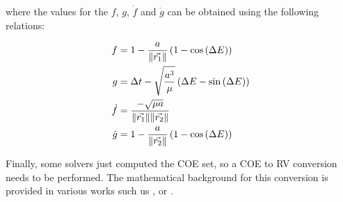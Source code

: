 where the values for the $f$, $g$, $\dot{f}$ and $\dot{g}$ can be obtained using
the following relations:

\begin{align}
  f &= 1 - \frac{a}{\lVert\vec{r_1}\rVert} \left(1 - \cos{(\Delta E)} \right)\\
  g &= \Delta t - \sqrt{\frac{a^3}{\mu}} \left(\Delta E - \sin{(\Delta E)}\right)\\
  \dot{f} &= \frac{-\sqrt{\mu a}}{\lVert\vec{r_1}\rVert \lVert\vec{r_2}\rVert}\\
  \dot{g} &= 1 - \frac{a}{\lVert\vec{r_2}\rVert} \left(1 - \cos{(\Delta E)} \right)
\end{align}

Finally, some solvers just computed the COE set, so a COE to RV conversion needs
to be performed. The mathematical background for this conversion is provided in
various works such us \cite{bate1971}, \cite{vallado2013} or
\cite{curtis2020}.
